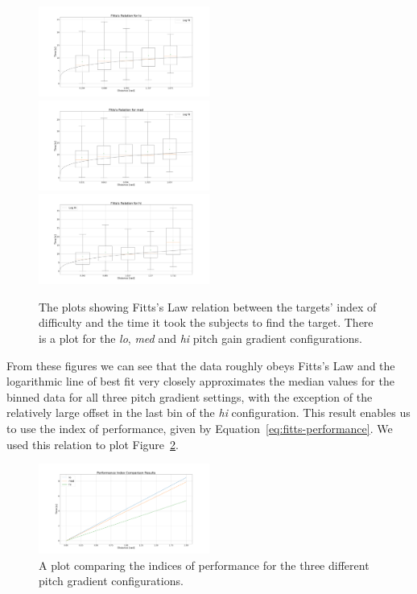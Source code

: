 \documentclass[format=sigconf, review=true, screen=true, anonymous=true]{acmart}
\begin{document}
\begin{figure}
  \centering
  \includegraphics[width=0.5\textwidth]{figures/fitts_lo.png}
  \includegraphics[width=0.5\textwidth]{figures/fitts_med.png}
  \includegraphics[width=0.5\textwidth]{figures/fitts_hi.png}
  \caption{The plots showing Fitts's Law relation between the targets' index of difficulty and the time it took the subjects to find the target. There is a plot for the \emph{lo}, \emph{med} and \emph{hi} pitch gain gradient configurations.} 
  \label{fig:fitts}
\end{figure}

From these figures we can see that the data roughly obeys Fitts's Law and the logarithmic line of best fit very closely approximates the median values for the binned data for all three pitch gradient settings, with the exception of the relatively large offset in the last bin of the \emph{hi} configuration. This result enables us to use the index of performance, given by Equation~\ref{eq:fitts-performance}. We used this relation to plot Figure~\ref{fig:fitts-performance}.

\begin{figure}
  \centering
  \includegraphics[width=0.5\textwidth]{figures/fitts_performance.png}
  \caption{A plot comparing the indices of performance for the three different pitch gradient configurations.}
  \label{fig:fitts-performance}
\end{figure}
\end{document}
